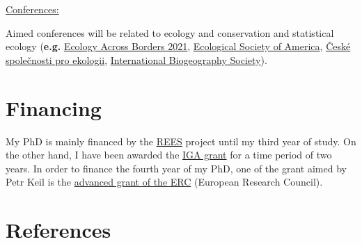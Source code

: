 \documentclass[
  12pt,
  oneside]{report}
\begin{document}
\underline{Conferences:}

Aimed conferences will be related to ecology and conservation and statistical ecology (\textbf{e.g.} \href{https://www.britishecologicalsociety.org/events/festival-of-ecology/ecology-across-borders-2021/}{Ecology Across Borders 2021}, \href{https://www.esa.org/events/meetings/future-esa-meetings/}{Ecological Society of America}, \href{https://www.cspe.cz/konference/ekologie-2021/}{České společnosti pro ekologii}, \href{https://www.biogeography.org/meetings/}{International Biogeography Society}).\newline\newline

\begingroup
\let\clearpage\relax

\hypertarget{financing}{%
\chapter{Financing}\label{financing}}

My PhD is mainly financed by the \href{https://www.fzp.czu.cz/en/r-9676-news/announcement-of-rees.html}{REES} project until my third year of study. On the other hand, I have been awarded the \href{https://www.fzp.czu.cz/en/r-9409-science-research/r-9531-internal-grant}{IGA grant} for a time period of two years. In order to finance the fourth year of my PhD, one of the grant aimed by Petr Keil is the \href{https://erc.europa.eu/funding/advanced-grants}{advanced grant of the ERC} (European Research Council).

\endgroup


\singlespacing %
\chapter{References}\label{references}
{
\renewcommand{\clearpage}{}
\printbibliography[heading=none] %
}
\end{document}
